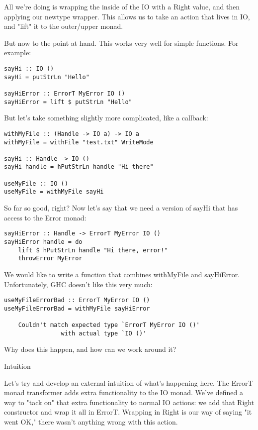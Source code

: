 All we're doing is wrapping the inside of the IO with a Right value, and then applying our newtype wrapper. This allows us to take an action that lives in IO, and "lift" it to the outer/upper monad.

But now to the point at hand. This works very well for simple functions. For example:

\begin{lstlisting}
sayHi :: IO ()
sayHi = putStrLn "Hello"

sayHiError :: ErrorT MyError IO ()
sayHiError = lift $ putStrLn "Hello"
\end{lstlisting}

But let's take something slightly more complicated, like a callback:

\begin{lstlisting}
withMyFile :: (Handle -> IO a) -> IO a
withMyFile = withFile "test.txt" WriteMode

sayHi :: Handle -> IO ()
sayHi handle = hPutStrLn handle "Hi there"

useMyFile :: IO ()
useMyFile = withMyFile sayHi
\end{lstlisting}

So far so good, right? Now let's say that we need a version of sayHi that has access to the Error monad:

\begin{lstlisting}
sayHiError :: Handle -> ErrorT MyError IO ()
sayHiError handle = do
    lift $ hPutStrLn handle "Hi there, error!"
    throwError MyError
\end{lstlisting}

We would like to write a function that combines withMyFile and sayHiError. Unfortunately, GHC doesn't like this very much:

\begin{lstlisting}
useMyFileErrorBad :: ErrorT MyError IO ()
useMyFileErrorBad = withMyFile sayHiError

    Couldn't match expected type `ErrorT MyError IO ()'
                with actual type `IO ()'
\end{lstlisting}

Why does this happen, and how can we work around it?

Intuition

Let's try and develop an external intuition of what's happening here. The ErrorT monad transformer adds extra functionality to the IO monad. We've defined a way to "tack on" that extra functionality to normal IO actions: we add that Right constructor and wrap it all in ErrorT. Wrapping in Right is our way of saying "it went OK," there wasn't anything wrong with this action.

